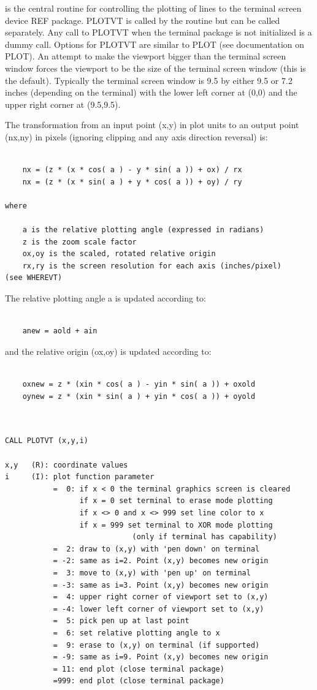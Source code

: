 \documentclass[11pt]{report}
\begin{document}
 is the central routine for controlling the plotting of lines to
the terminal screen device REF package.  PLOTVT is called by
the  routine but can be called separately.  Any call to PLOTVT
when the terminal package is not initialized is a dummy call.  Options
for PLOTVT are similar to PLOT (see documentation on PLOT).  An
attempt to make the viewport bigger than the terminal screen window
forces the viewport to be the size of the terminal screen window
(this is the default).  Typically the terminal screen window is 9.5 by
either 9.5 or 7.2 inches (depending on the terminal) with the lower
left corner at (0,0) and the upper right corner at (9.5,9.5).

The transformation from an input point (x,y) in plot units to an
output point (nx,ny) in pixels (ignoring clipping and any axis
direction reversal) is:
\begin{verbatim}

    nx = (z * (x * cos( a ) - y * sin( a )) + ox) / rx
    nx = (z * (x * sin( a ) + y * cos( a )) + oy) / ry

where

    a is the relative plotting angle (expressed in radians)
    z is the zoom scale factor
    ox,oy is the scaled, rotated relative origin
    rx,ry is the screen resolution for each axis (inches/pixel)
(see WHEREVT)
\end{verbatim}
The relative plotting angle a is updated according to:
\begin{verbatim}

    anew = aold + ain

\end{verbatim}
and the relative origin (ox,oy) is updated according to:
\begin{verbatim}

    oxnew = z * (xin * cos( a ) - yin * sin( a )) + oxold
    oynew = z * (xin * sin( a ) + yin * cos( a )) + oyold
	
\end{verbatim}
\begin{verbatim}

CALL PLOTVT (x,y,i)

x,y   (R): coordinate values
i     (I): plot function parameter
           =  0: if x < 0 the terminal graphics screen is cleared
                 if x = 0 set terminal to erase mode plotting
                 if x <> 0 and x <> 999 set line color to x
                 if x = 999 set terminal to XOR mode plotting
                             (only if terminal has capability)
           =  2: draw to (x,y) with 'pen down' on terminal
           = -2: same as i=2. Point (x,y) becomes new origin
           =  3: move to (x,y) with 'pen up' on terminal
           = -3: same as i=3. Point (x,y) becomes new origin
           =  4: upper right corner of viewport set to (x,y)
           = -4: lower left corner of viewport set to (x,y)
           =  5: pick pen up at last point
           =  6: set relative plotting angle to x
           =  9: erase to (x,y) on terminal (if supported)
           = -9: same as i=9. Point (x,y) becomes new origin
           = 11: end plot (close terminal package)
           =999: end plot (close terminal package)
\end{verbatim}
\end{document}
